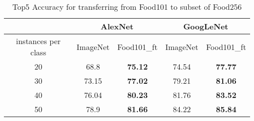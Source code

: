 \begin{table}[htbp]
  \centering
  \caption{Top5 Accuracy for transferring from Food101 to subset of Food256}
    \begin{tabular}{c|cc|cc}
    \toprule
          & \multicolumn{2}{c|}{AlexNet} & \multicolumn{2}{c}{GoogLeNet} \\
    \midrule
    instances per class & ImageNet  & Food101\_ft    &  ImageNet  & Food101\_ft \\ \midrule
    20    & 68.8  & \textbf{75.12} & 74.54 & \textbf{77.77} \\
    30    & 73.15 & \textbf{77.02} & 79.21 & \textbf{81.06} \\
    40    & 76.04 & \textbf{80.23} & 81.76 & \textbf{83.52} \\
    50    & 78.9  & \textbf{81.66} & 84.22 & \textbf{85.84} \\
    \bottomrule
    \end{tabular}%
  \label{tab:cross}%
\end{table}%

